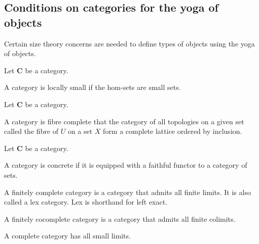 \subsection{Conditions on categories for the yoga of objects}

Certain size theory concerns are needed to define types of objects using the yoga of objects.

\begin{definition}
    Let $\mathbf{C}$ be a category.

    A category is locally small if the hom-sets are small sets.
\end{definition}

\begin{definition}
    Let $\mathbf{C}$ be a category.

    A category is fibre complete that the category of all topologies on a given set called the fibre of $U$ on a set $X$ form a complete lattice ordered by inclusion.
\end{definition}

\begin{definition}
    Let $\mathbf{C}$ be a category.

    A category is concrete if it is equipped with a faithful functor to a category of sets.
\end{definition}

\begin{definition}
    \label{definition-finitely-complete}
    A finitely complete category is a category that admits all finite limits. It is also called a lex category. Lex is shorthand for left exact. 
\end{definition}

\begin{definition}
    \label{definition-finitely-cocomplete}
    A finitely cocomplete category is a category that admits all finite colimits.
\end{definition}

\begin{definition}
    \label{definition-complete}
    A complete category has all small limits.
\end{definition}

